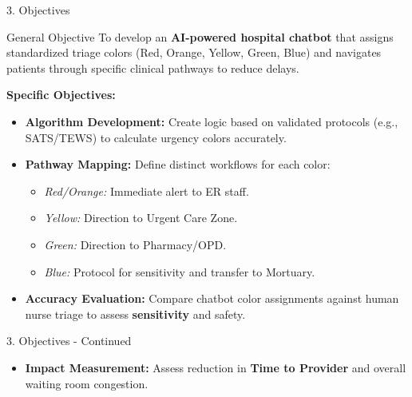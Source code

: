 \documentclass[aspectratio=169]{beamer}
\begin{document}
	\begin{frame}{3. Objectives}
		\begin{block}{General Objective}
			To develop an \textbf{AI-powered hospital chatbot} that assigns standardized triage colors (Red, Orange, Yellow, Green, Blue) and navigates patients through specific clinical pathways to reduce delays.
		\end{block}
		
		\vspace{0.09cm}
		\textbf{Specific Objectives:}
		\begin{itemize}
			\item \textbf{Algorithm Development:} Create logic based on validated protocols (e.g., SATS/TEWS) to calculate urgency colors accurately.
			\item \textbf{Pathway Mapping:} Define distinct workflows for each color:
			\begin{itemize} \footnotesize
				\item \emph{Red/Orange:} Immediate alert to ER staff.
				\item \emph{Yellow:} Direction to Urgent Care Zone.
				\item \emph{Green:} Direction to Pharmacy/OPD.
				\item \emph{Blue:} Protocol for sensitivity and transfer to Mortuary.
			\end{itemize}
			\item \textbf{Accuracy Evaluation:} Compare chatbot color assignments against human nurse triage to assess \textbf{sensitivity} and safety.
			
		\end{itemize}
	\end{frame}
	
	\begin{frame}{3. Objectives - Continued}
		\begin{itemize}
			\item \textbf{Impact Measurement:} Assess reduction in \textbf{Time to Provider} and overall waiting room congestion.
		\end{itemize}
		
	\end{frame}
	
\end{document}

